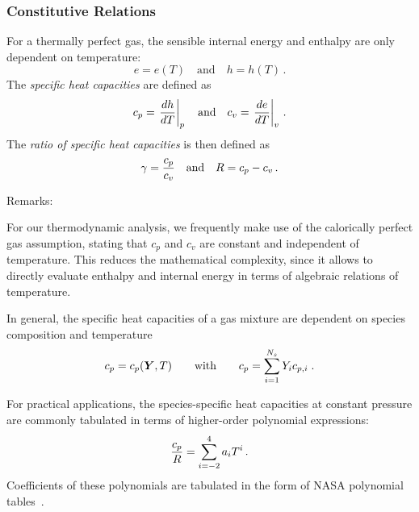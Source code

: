 \subsubsection{Constitutive Relations}
For a thermally perfect  gas, the sensible internal energy and enthalpy are only dependent on temperature:
\begin{equation}
 e = e(T) \quad \text{and} \quad h = h(T)\,.
\end{equation}
The {\it specific heat capacities} are defined as
\begin{equation}
  c_p = \left.{\frac{dh}{dT}}\right|_p \quad \text{and} \quad c_v = \left.{\frac{de}{dT}}\right|_v\,.
\end{equation}
The {\it ratio of specific heat capacities} is then defined as
\begin{equation}
 \gamma = {\frac{c_p}{c_v}}\quad\text{and}\quad R = c_p - c_v \, \text{.}
\end{equation}

Remarks:
\begin{itemizePacked}
 \item For our thermodynamic analysis, we frequently make use of the calorically perfect gas assumption, stating that $c_p$ and $c_v$ are constant and independent of temperature.
 This reduces the mathematical complexity, since it allows to directly evaluate enthalpy and internal energy in terms of algebraic relations of temperature.
 \item In general, the specific heat capacities of a gas mixture are dependent on species composition and temperature
 \begin{equation}
  c_p = c_p({\mbox{\boldmath$Y$}},T)\qquad\text{with}\qquad c_p = \sum_{i=1}^{N_s} Y_i c_{p,i}\;.
 \end{equation}
 \item For practical applications, the species-specific heat capacities at constant pressure are commonly tabulated in terms of higher-order 
 polynomial expressions:
 \[
  {\frac{c_{p}}{R}} = \sum^4_{i=-2} a_i T^i \, \text{.}
 \]
Coefficients of these polynomials are tabulated in the form of NASA polynomial tables~\cite{MCBRIDE_ZEHE_GORDON_NASA2002}.
\end{itemizePacked}
